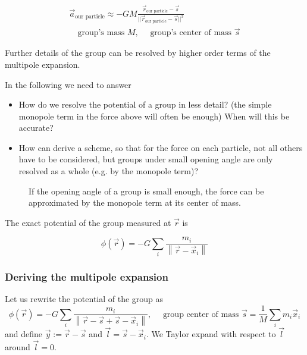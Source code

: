 \begin{equation}
    \begin{gathered}
        \vec{a}_\text{our particle} \approx -GM \frac{\vec{r}_\text{our particle} - \vec{s}}{||\vec{r}_\text{our particle} - \vec{s}||^3} \\ \quad \text{group's mass } M, \quad \text{ group's center of mass } \vec{s}
    \end{gathered}
\end{equation}

Further details of the group can be resolved by higher order terms of the multipole expansion.

In the following we need to answer
\begin{itemize}
    \item How do we resolve the potential of a group in less detail? (the simple monopole term in the force above will often be enough) When will this be accurate?
    \item How can derive a scheme, so that for the force on each particle, not all others have to be considered, but groups under small opening angle are only resolved as a whole (e.g. by the monopole term)?
\end{itemize}

\begin{figure}[H]
    \centering
    
    \caption{If the opening angle of a group is small enough, the force can be approximated by the monopole term at its center of mass.}
    \label{fig:multipole}
\end{figure}

The exact potential of the group measured at $\vec{r}$ is

\begin{equation}
    \phi(\vec{r})=-G \sum_i \frac{m_i}{\left\|\vec{r}-\vec{x}_i\right\|}
\end{equation}

\subsubsection{Deriving the multipole expansion}
Let us rewrite the potential of the group as
\begin{equation}
    \phi(\vec{r})=-G \sum_i \frac{m_i}{\left\|\vec{r}-\vec{s}+\vec{s}-\vec{x}_i\right\|}, \quad \text { group center of mass } \vec{s}=\frac{1}{M} \sum_i m_i \vec{x}_i
\end{equation}
and define $\vec{y} := \vec{r} - \vec{s}$ and $\vec{l} = \vec{s} - \vec{x}_i$.
We Taylor expand with respect to $\vec{l}$ around $\vec{l} = 0$.

